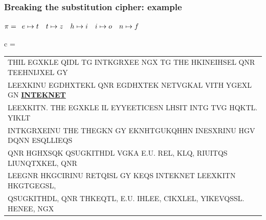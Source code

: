\documentclass[aspectratio=169, lualatex, 10pt,dvipsnames,svgnames]{beamer} %
\def\enbleu#1{\textcolor{bleu}{#1}}
\def\enrouge#1{\textcolor{rouge}{#1}}
\begin{document}
\begin{frame}
  \frametitle{Breaking the substitution cipher: example}
  
    \enrouge{
    \tiny{$\pi=
      \begin{array}[t]{l}
           e\mapsto t\quad t\mapsto z \quad h\mapsto i\quad i\mapsto o\quad n\mapsto f
      \end{array}
      $}}
  \vspace{0.25cm}

  \color{vert}
  \tiny{c =
    \begin{tabular}[t]{l}
      \enbleu{T}\enbleu{H}\enbleu{I}L EGXKL\enbleu{E} Q\enbleu{I}DL \enbleu{T}G \enbleu{I}\enbleu{N}\enbleu{T}KGRXE\enbleu{E} NGX \enbleu{T}G \enbleu{T}\enbleu{H}\enbleu{E} HK\enbleu{I}\enbleu{N}E\enbleu{I}HS\enbleu{E}L Q\enbleu{N}R \enbleu{T}\enbleu{E}E\enbleu{H}\enbleu{N}\enbleu{I}JX\enbleu{E}L GY \\
      L\enbleu{E}EXK\enbleu{I}\enbleu{N}U EGDHX\enbleu{T}\enbleu{E}KL Q\enbleu{N}R EGDHX\enbleu{T}\enbleu{E}K \enbleu{N}\enbleu{E}\enbleu{T}VGKAL V\enbleu{I}\enbleu{T}\enbleu{H} YGEXL G\enbleu{N} \underline{\bf \enbleu{I}\enbleu{N}\enbleu{T}\enbleu{E}K\enbleu{N}\enbleu{E}\enbleu{T}} \\
      L\enbleu{E}EXK\enbleu{I}\enbleu{T}N. \enbleu{T}\enbleu{H}\enbleu{E} EGXKL\enbleu{E} \enbleu{I}L \enbleu{E}YY\enbleu{E}E\enbleu{T}\enbleu{I}C\enbleu{E}SN LHS\enbleu{I}\enbleu{T} \enbleu{I}\enbleu{N}\enbleu{T}G \enbleu{T}VG HQK\enbleu{T}L. Y\enbleu{I}KL\enbleu{T} \\
      \enbleu{I}\enbleu{N}\enbleu{T}KGRXE\enbleu{I}\enbleu{N}U \enbleu{T}\enbleu{H}\enbleu{E} \enbleu{T}\enbleu{H}\enbleu{E}GKN GY EKNH\enbleu{T}GUKQH\enbleu{H}N \enbleu{I}\enbleu{N}ESXR\enbleu{I}\enbleu{N}U \enbleu{H}GV DQ\enbleu{N}N ESQLL\enbleu{I}EQS \\
      Q\enbleu{N}R HGHXSQK QSUGK\enbleu{I}\enbleu{T}\enbleu{H}DL VGKA \enbleu{E}.U. R\enbleu{E}L, KLQ, R\enbleu{I}U\enbleu{I}\enbleu{T}QS L\enbleu{I}U\enbleu{N}Q\enbleu{T}XK\enbleu{E}L, Q\enbleu{N}R \\
      L\enbleu{E}EG\enbleu{N}R HKGC\enbleu{I}R\enbleu{I}\enbleu{N}U R\enbleu{E}\enbleu{T}Q\enbleu{I}SL GY K\enbleu{E}QS \enbleu{I}\enbleu{N}\enbleu{T}\enbleu{E}K\enbleu{N}\enbleu{E}\enbleu{T} L\enbleu{E}EXK\enbleu{I}\enbleu{T}N HKG\enbleu{T}GEGSL, \\
      QSUGK\enbleu{I}\enbleu{T}\enbleu{H}DL, Q\enbleu{N}R \enbleu{T}\enbleu{H}K\enbleu{E}Q\enbleu{T}L, \enbleu{E}.U. \enbleu{I}HL\enbleu{E}E, C\enbleu{I}KXL\enbleu{E}L, Y\enbleu{I}K\enbleu{E}VQSSL. \enbleu{H}\enbleu{E}\enbleu{N}E\enbleu{E}, NGX \\

\end{tabular}}
\end{frame}
\end{document}
